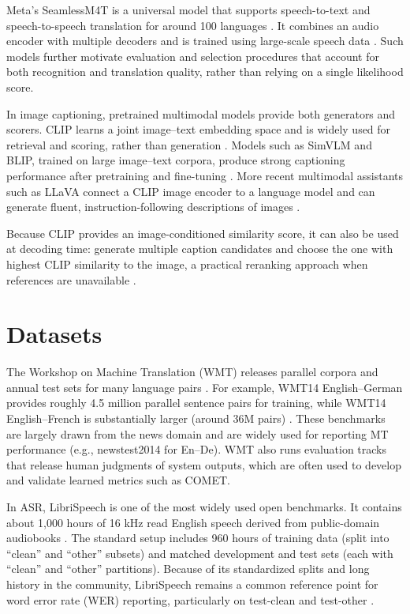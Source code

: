 Meta’s SeamlessM4T is a universal model that supports speech-to-text and speech-to-speech translation for around 100 languages \cite{seamlessm4t2023}. It combines an audio encoder with multiple decoders and is trained using large-scale speech data \cite{seamless2023}. Such models further motivate evaluation and selection procedures that account for both recognition and translation quality, rather than relying on a single likelihood score.

In image captioning, pretrained multimodal models provide both generators and scorers. CLIP learns a joint image--text embedding space and is widely used for retrieval and scoring, rather than generation \cite{radford2021clip}. Models such as SimVLM and BLIP, trained on large image--text corpora, produce strong captioning performance after pretraining and fine-tuning \cite{wang2021simvlm,li2022blip}. More recent multimodal assistants such as LLaVA connect a CLIP image encoder to a language model and can generate fluent, instruction-following descriptions of images \cite{liu2023llava,radford2021clip,touvron2023llama}.

Because CLIP provides an image-conditioned similarity score, it can also be used at decoding time: generate multiple caption candidates and choose the one with highest CLIP similarity to the image, a practical reranking approach when references are unavailable \cite{radford2021clip}.

\section{Datasets}
The Workshop on Machine Translation (WMT) releases parallel corpora and annual test sets for many language pairs \cite{bojar2014wmt}. For example, WMT14 English--German provides roughly 4.5 million parallel sentence pairs for training, while WMT14 English--French is substantially larger (around 36M pairs) \cite{vaswani2017attention}. These benchmarks are largely drawn from the news domain and are widely used for reporting MT performance (e.g., newstest2014 for En--De). WMT also runs evaluation tracks that release human judgments of system outputs, which are often used to develop and validate learned metrics such as COMET.

In ASR, LibriSpeech is one of the most widely used open benchmarks. It contains about 1,000 hours of 16 kHz read English speech derived from public-domain audiobooks \cite{panayotov2015librispeech}. The standard setup includes 960 hours of training data (split into “clean” and “other” subsets) and matched development and test sets (each with “clean” and “other” partitions). Because of its standardized splits and long history in the community, LibriSpeech remains a common reference point for word error rate (WER) reporting, particularly on test-clean and test-other \cite{openslr12}.

